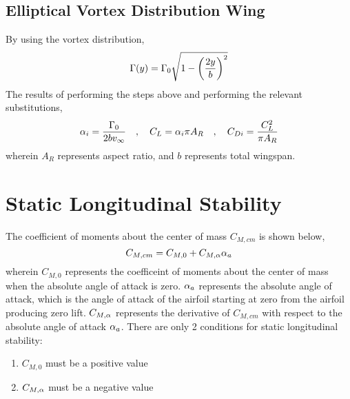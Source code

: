 \documentclass[a4paper, 12pt]{report}
\begin{document}
\begin{center}
\subsection{Elliptical Vortex Distribution Wing}
\begin{comment}
\end{comment}
By using the vortex distribution,
$$\Gamma(y) = \Gamma_0\sqrt{\displaystyle{1-\left(\frac{2y}{b}\right)^2}}$$
The results of performing the steps above and performing the relevant substitutions,
$$\alpha_i = \frac{\Gamma_0}{2bv_\infty} \quad,\quad C_L = \alpha_i \pi A_R \quad,\quad C_{Di} = \frac{C_L^2}{\pi A_R}$$
wherein $A_R$ represents aspect ratio, and $b$ represents total wingspan.
\section{Static Longitudinal Stability}
\begin{comment}
\end{comment}
The coefficient of moments about the center of mass $C_{M,cm}$ is shown below,
$$C_{M,cm} = C_{M,0} + C_{M,\alpha}\alpha_a$$
wherein $C_{M,0}$ represents the coefficeint of moments about the center of mass when the absolute angle of attack is zero. $\alpha_a$ represents the absolute angle of attack, which is the angle of attack of the airfoil starting at zero from the airfoil producing zero lift. $C_{M,\alpha}$ represents the derivative of $C_{M,cm}$ with respect to the absolute angle of attack $\alpha_a$. There are only 2 conditions for static longitudinal stability:
\begin{enumerate}
\centering
\item $C_{M,0}$ must be a positive value 
\item $C_{M,\alpha}$ must be a negative value
\end{enumerate}
\end{center}
\end{document}
